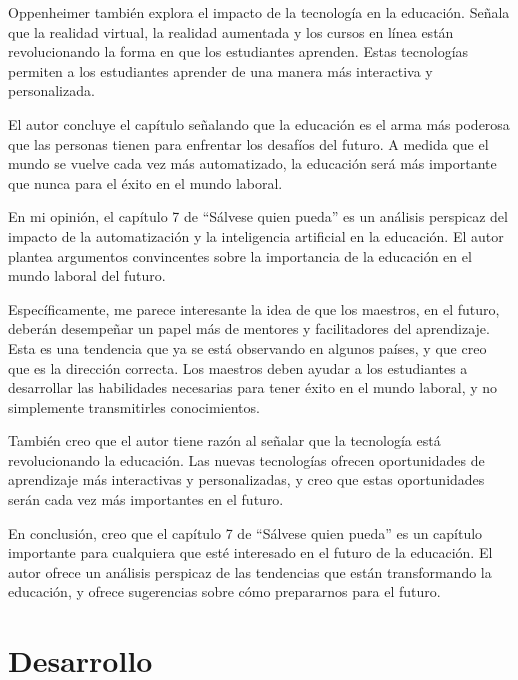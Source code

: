 \documentclass[letterpaper, 12pt]{article}
\begin{document}
\begin{itemize}[label=$\triangleright$]
          Oppenheimer también explora el impacto de la tecnología en
          la educación. Señala que la realidad virtual, la realidad
          aumentada y los cursos en línea están revolucionando la
          forma en que los estudiantes aprenden. Estas tecnologías
          permiten a los estudiantes aprender de una manera más
          interactiva y personalizada.

          El autor concluye el capítulo señalando que la educación es
          el arma más poderosa que las personas tienen para enfrentar
          los desafíos del futuro. A medida que el mundo se vuelve
          cada vez más automatizado, la educación será más importante
          que nunca para el éxito en el mundo laboral.

          En mi opinión, el capítulo 7 de ``Sálvese quien pueda'' es
          un análisis perspicaz del impacto de la automatización y la
          inteligencia artificial en la educación. El autor plantea
          argumentos convincentes sobre la importancia de la
          educación en el mundo laboral del futuro.

          Específicamente, me parece interesante la idea de que los
          maestros, en el futuro, deberán desempeñar un papel más de
          mentores y facilitadores del aprendizaje. Esta es una
          tendencia que ya se está observando en algunos países, y
          que creo que es la dirección correcta. Los maestros deben
          ayudar a los estudiantes a desarrollar las habilidades
          necesarias para tener éxito en el mundo laboral, y no
          simplemente transmitirles conocimientos.

          También creo que el autor tiene razón al señalar que la
          tecnología está revolucionando la educación. Las nuevas
          tecnologías ofrecen oportunidades de aprendizaje más
          interactivas y personalizadas, y creo que estas
          oportunidades serán cada vez más importantes en el futuro.

          En conclusión, creo que el capítulo 7 de ``Sálvese quien
          pueda'' es un capítulo importante para cualquiera que esté
          interesado en el futuro de la educación. El autor ofrece un
          análisis perspicaz de las tendencias que están
          transformando la educación, y ofrece sugerencias sobre cómo
          prepararnos para el futuro.
\end{itemize}

\section*{Desarrollo}
\end{document}
